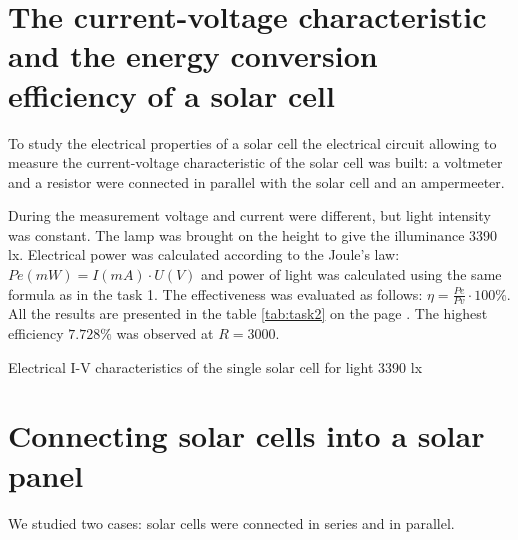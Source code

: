 \documentclass[12pt, letterpaper]{article}
\begin{document}
\newpage
\section{The current-voltage characteristic and the energy conversion efficiency of a solar cell}
To study the electrical properties of a solar cell the electrical circuit allowing to measure the current-voltage characteristic of the solar cell was built: a voltmeter and a resistor were connected in parallel with the solar cell and an ampermeeter.
\par
During the measurement voltage and current were different, but light intensity was constant. The lamp was brought on the height to give the illuminance 3390 lx. Electrical power was calculated
according to the Joule's law: $Pe (mW) = I(mA) \cdot U(V)$ and power of light was calculated using the same formula as in the task 1. The effectiveness was evaluated as follows: $\eta = \frac{Pe}{Pv} \cdot 100 \%$. All the results are presented in the table \ref{tab:task2} on the page \pageref{tab:task2}. The highest efficiency $7.728\%$ was observed at $R = 3000$.

\begin{table}[htb]
\centering
{}
\caption{Electrical I-V characteristics of the single solar cell for light 3390 lx}
\label{tab:task2}
\end{table}
\newpage
\section{Connecting solar cells into a solar panel}
We studied two cases: solar cells were connected in series and in parallel.
\end{document}
